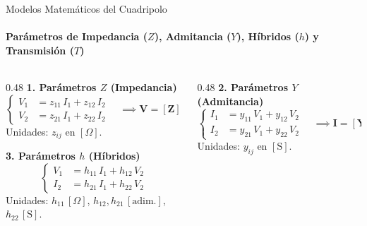 \documentclass[10pt, aspectratio=169]{beamer}
\begin{document}
\begin{frame}{Modelos Matemáticos del Cuadripolo}
    \framesubtitle{Parámetros de Impedancia ($Z$), Admitancia ($Y$), Híbridos ($h$) y Transmisión ($T$)}

    \begin{columns}[t]
        \begin{column}{0.48\textwidth}
            \textbf{1. Parámetros $Z$ (Impedancia)}
            \begin{equation*}
                \left\{
                \begin{aligned}
                    V_1 & = z_{11}\,I_1 + z_{12}\,I_2 \\
                    V_2 & = z_{21}\,I_1 + z_{22}\,I_2
                \end{aligned}
                \right.
                \quad \implies \mathbf{V} = \mathbf{[Z]}\,\mathbf{I}
            \end{equation*}
            \centering \small Unidades: $z_{ij}$ en $[\Omega]$.

            \vspace{0.5cm}
            \raggedright
            \textbf{3. Parámetros $h$ (Híbridos)}
            \begin{equation*}
                \left\{
                \begin{aligned}
                    V_1 & = h_{11}\,I_1 + h_{12}\,V_2 \\
                    I_2 & = h_{21}\,I_1 + h_{22}\,V_2
                \end{aligned}
                \right.
            \end{equation*}
            \centering \small Unidades: $h_{11}\,[\Omega]$, $h_{12}, h_{21}\,[\text{adim.}]$, $h_{22}\,[\text{S}]$.
        \end{column}

        \begin{column}{0.48\textwidth}
            \textbf{2. Parámetros $Y$ (Admitancia)}
            \begin{equation*}
                \left\{
                \begin{aligned}
                    I_1 & = y_{11}\,V_1 + y_{12}\,V_2 \\
                    I_2 & = y_{21}\,V_1 + y_{22}\,V_2
                \end{aligned}
                \right.
                \quad \implies \mathbf{I} = \mathbf{[Y]}\,\mathbf{V}
            \end{equation*}
            \centering \small Unidades: $y_{ij}$ en $[\text{S}]$.


\end{column}
\end{columns}
\end{frame}
\end{document}
